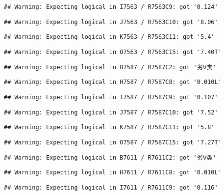\documentclass[
]{article}
\begin{document}
\begin{verbatim}
## Warning: Expecting logical in I7563 / R7563C9: got '0.124'
\end{verbatim}

\begin{verbatim}
## Warning: Expecting logical in J7563 / R7563C10: got '8.06'
\end{verbatim}

\begin{verbatim}
## Warning: Expecting logical in K7563 / R7563C11: got '5.4'
\end{verbatim}

\begin{verbatim}
## Warning: Expecting logical in O7563 / R7563C15: got '7.40T'
\end{verbatim}

\begin{verbatim}
## Warning: Expecting logical in B7587 / R7587C2: got '劣Ⅴ类'
\end{verbatim}

\begin{verbatim}
## Warning: Expecting logical in H7587 / R7587C8: got '0.010L'
\end{verbatim}

\begin{verbatim}
## Warning: Expecting logical in I7587 / R7587C9: got '0.107'
\end{verbatim}

\begin{verbatim}
## Warning: Expecting logical in J7587 / R7587C10: got '7.52'
\end{verbatim}

\begin{verbatim}
## Warning: Expecting logical in K7587 / R7587C11: got '5.8'
\end{verbatim}

\begin{verbatim}
## Warning: Expecting logical in O7587 / R7587C15: got '7.27T'
\end{verbatim}

\begin{verbatim}
## Warning: Expecting logical in B7611 / R7611C2: got '劣Ⅴ类'
\end{verbatim}

\begin{verbatim}
## Warning: Expecting logical in H7611 / R7611C8: got '0.010L'
\end{verbatim}

\begin{verbatim}
## Warning: Expecting logical in I7611 / R7611C9: got '0.116'
\end{verbatim}
\end{document}
